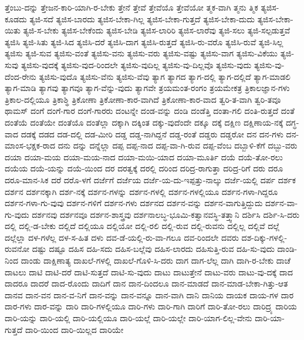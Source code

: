{ತ್ತೆಂಬು-ದನ್ನು
ತ್ತೇಜನ-ಕಾರಿ-ಯಾಗಿ-ರ-ಬೇಕು
ತ್ತೇನೆ
ತ್ತೇವೆ
ತ್ತೇವೆಯೊ
ತ್ತೇವೆಯೋ
ತ್ಮಕ-ವಾಗಿ
ತ್ಮನು
ತ್ಮಿಕ
ತ್ಯಜಿಸ-ಕೂಡದು
ತ್ಯಜಿ-ಸದೆ
ತ್ಯಜಿಸ-ಬಾರದು
ತ್ಯಜಿಸ-ಬೇಕಾ-ಗಿಲ್ಲ
ತ್ಯಜಿಸ-ಬೇಕಾ-ಗುತ್ತದೆ
ತ್ಯಜಿಸ-ಬೇಕಾ-ದುದು
ತ್ಯಜಿಸ-ಬೇಕಾ-ಯಿತು
ತ್ಯಜಿ-ಸ-ಬೇಕು
ತ್ಯಜಿಸ-ಬೇಕೆಂದು
ತ್ಯಜಿಸ-ಬೇಡಿ
ತ್ಯಜಿಸ-ಲಾರಿರಿ
ತ್ಯಜಿಸ-ಲಾರೆವು
ತ್ಯಜಿ-ಸಲು
ತ್ಯಜಿ-ಸಲ್ಪಡುತ್ತವೆ
ತ್ಯಜಿಸಿ
ತ್ಯಜಿ-ಸಿತು
ತ್ಯಜಿ-ಸಿದ
ತ್ಯಜಿಸಿ-ದರೆ
ತ್ಯಜಿಸಿ-ದಾಗ
ತ್ಯಜಿಸಿ-ರುತ್ತದೆ
ತ್ಯಜಿಸಿ-ರು-ವರೊ
ತ್ಯಜಿಸಿ-ರುವೆ
ತ್ಯಜಿ-ಸಿಲ್ಲ
ತ್ಯಜಿಸು
ತ್ಯಜಿ-ಸುವ
ತ್ಯಜಿಸು-ವಂತೆ
ತ್ಯಜಿಸು-ವನು
ತ್ಯಜಿಸು-ವರು
ತ್ಯಜಿಸು-ವಷ್ಟು
ತ್ಯಜಿಸು-ವಾಗ
ತ್ಯಜಿಸು-ವಿಕೆಯು
ತ್ಯಜಿ-ಸುವು
ತ್ಯಜಿಸು-ವುದಕ್ಕೆ
ತ್ಯಜಿಸು-ವುದ-ರಿಂದಲೇ
ತ್ಯಜಿಸು-ವುದಿಲ್ಲ
ತ್ಯಜಿಸು-ವು-ದಿಲ್ಲವೊ
ತ್ಯಜಿಸು-ವುದು
ತ್ಯಜಿಸು-ವು-ದೆಂದ-ರೇನು
ತ್ಯಜಿಸು-ವುದೊ
ತ್ಯಜಿಸು-ವೆನು
ತ್ಯಜಿಸು-ವೆವು
ತ್ಯಾಗ
ತ್ಯಾಗದ
ತ್ಯಾಗ-ದಲ್ಲಿ
ತ್ಯಾಗ-ದಲ್ಲಿದೆ
ತ್ಯಾಗ-ಮಾಡಲಿ
ತ್ಯಾಗ-ಮಾಡಿ
ತ್ಯಾಗವು
ತ್ಯಾಗವೂ
ತ್ಯಾಗ-ವೆನ್ನು-ವುದು
ತ್ಯಾಗವೇ
ತ್ರಯಮಂತ-ರಂಗಂ
ತ್ರಯಮೇಕತ್ರ
ತ್ರಿಕಾಲಜ್ಞಾನ-ಗಳು
ತ್ರಿಕಾಲ-ದಲ್ಲಿಯೂ
ತ್ರಿಕಾಶ್ಥಿ
ತ್ರಿಕೋಣಾ
ತ್ರಿಕೋಣಾ-ಕಾರ-ವಾಗಿದೆ
ತ್ರಿಕೋಣಾ-ಕಾರ-ವಾದ
ತ್ವರಿ-ತ-ವಾಗಿ
ತ್ವರಿ-ತವೂ
ಥಾಮಸ್
ದಂಗೆ
ದಂಗೆ-ಗಾರ
ದಂಗೆ-ಗಾರರು
ದಂಟನ್ನೇ
ದಂಡ-ವನ್ನು
ದಂಡಿ
ದಂಡೆತ್ತಿ
ದಂತಾ-ಗಲಿ
ದಂತಿ-ರುತ್ತದೆ
ದಂತೆ
ದಂತೆಯೆ
ದಂತೆಯೇ
ದಂತೆಯೊ
ದಂತೆಲ್ಲಾ
ದಕ್ಕಾಗಿ
ದಕ್ಕಿಂತ
ದಕ್ಕು-ವುದೆಂದೇ
ದಕ್ಕೂ
ದಕ್ಕೆ
ದಕ್ಷಿಣ
ದಕ್ಷಿಣಾಯ-ನಕ್ಕೆ
ದಗ್ಧ-ವಾದ
ದಡಕ್ಕೆ
ದಡದ
ದಡ-ದಲ್ಲಿ
ದಡ-ಮೀರಿ
ದಡ್ಡ
ದಡ್ಡ-ನಾಗಿದ್ದನೆ
ದಡ್ಡ-ರಂತೆ
ದಡ್ಡರು
ದಡ್ಡರೋ
ದನ
ದನ-ಗಳು
ದನ-ಮಾಂಸ-ಭಕ್ಷಕ-ರಾದ
ದನು
ದನ್ನು
ದನ್ನೆಲ್ಲಾ
ದಪ್ಪ
ದಪ್ಪ-ನಾದ
ದಪ್ಪ-ವಾ-ಗಿ-ರುವ
ದಪ್ಪ-ವೆಂಬ
ದಬ್ಬಾಳಿ-ಕೆಗೆ
ದಬ್ಬು-ವರು
ದಯಾ
ದಯಾ-ಮಯ
ದಯಾ-ಮಯ-ನಾದ
ದಯಾ-ಮಯಿ-ಯಾದ
ದಯಾ-ಮೂರ್ತಿ
ದಯೆ
ದಯೆ-ತೋ-ರಲು
ದಯೆಯ
ದಯೆ-ಯನ್ನು
ದಯೆ-ಯಿಂದ
ದರ
ದರತ್ವಕ್ಕೆ
ದರಲ್ಲಿ
ದರಿಂದ
ದರಿದ್ರ-ರಾಗುತ್ತಾ
ದರಿದ್ರ-ರಿಗೆ
ದರು
ದರೂ
ದರೂ-ಮಾನ-ಸಿಕ
ದರೆ
ದರೊ-ಳಗೆ
ದರ್ಜೆಗೆ
ದರ್ಜೆಯ
ದರ್ಜೆ-ಯ-ದು-ಇಪ್ಪತ್ತು-ನಾಲ್ಕು
ದರ್ಜೆ-ಯಲ್ಲಿ
ದರ್ಪ
ದರ್ಶಕ
ದರ್ಶನ
ದರ್ಶನಕ್ಕಾಗಿ
ದರ್ಶ-ನಕ್ಕೆ
ದರ್ಶನ-ಗಳನ್ನು
ದರ್ಶನ-ಗಳಲ್ಲಿ
ದರ್ಶನ-ಗಳಲ್ಲಿಯೂ
ದರ್ಶನ-ಗಳಾ-ಗಿದ್ದರೂ
ದರ್ಶನ-ಗಳಾ-ಗು-ವುವು
ದರ್ಶನ-ಗಳಿಗೆ
ದರ್ಶನ-ಗಳು
ದರ್ಶನದ
ದರ್ಶನ-ವನ್ನು
ದರ್ಶನ-ವಾಗುತ್ತಿದ್ದುದು
ದರ್ಶನ-ವಾ-ಗು-ವುದು
ದರ್ಶನವು
ದರ್ಶನವೂ
ದರ್ಶನ-ಶಾಸ್ತ್ರವು
ದರ್ಶನಾಲಬ್ಧ-ಭೂಮಿ-ಕತ್ವಾನವಸ್ಥಿ-ತತ್ತ್ವಾನಿ
ದರ್ಶಿಸಿ
ದರ್ಶಿ-ಸಿ-ದರು
ದಲ್ಲಿ
ದಲ್ಲಿ-ಡ-ಬೇಕು
ದಲ್ಲಿದೆ
ದಲ್ಲಿಯೂ
ದಲ್ಲಿಯೋ
ದಲ್ಲಿ-ರಲಿ
ದಲ್ಲಿ-ರುವ
ದಲ್ಲಿ-ರುವನು
ದಲ್ಲಿಲ್ಲ
ದಲ್ಲಿವೆ
ದಲ್ಲೆ
ದಲ್ಲೆಲ್ಲಾ
ದಳ-ಗಳೆಲ್ಲ
ದಳ-ಸ-ಹಿತ
ದಳು
ದವ-ಡೆ-ಯಲ್ಲಿ-ರು-ವಾ-ಗಲೂ
ದವ-ರಿಂದಲೇ
ದವರು
ದಶ-ದಿಕ್ಕು-ಗಳಲ್ಲಿ-ರುವನೋ
ದಷ್ಟು
ದಷ್ಟೂ
ದಹಿಸ
ದಹಿ-ಸದು
ದಹಿಸ-ಬಲ್ಲೆವು
ದಹಿಸ-ಲಾರದು
ದಹಿಸುತ್ತಿ-ರುವ
ದಹಿ-ಸು-ವುದು
ದಾಂಡಿ-ನಿಂದ
ದಾಂಡು
ದಾಕ್ಷಿಣಾತ್ಯ
ದಾಖಲೆ-ಗಳಲ್ಲಿ
ದಾಖಲೆ-ಗೊಳಿ-ಸಿ-ದರು
ದಾಗ
ದಾಗ-ಲೆಲ್ಲ
ದಾಗಿ
ದಾಗಿ-ರ-ಬೇಕು
ದಾಚೆ
ದಾಟಲು
ದಾಟಿ
ದಾಟಿ-ದರೆ
ದಾಟಿ-ಸುತ್ತದೆ
ದಾಟಿ-ಸು-ವುದು
ದಾಟು
ದಾಟುತ್ತೇನೆ
ದಾಟು-ವರು
ದಾಟು-ವು-ದಕ್ಕೆ
ದಾದ
ದಾದರೂ
ದಾದರೆ
ದಾದ-ರೊಂದು
ದಾದಿಗೆ
ದಾನ
ದಾನ-ದಿಂದಲೂ
ದಾನ-ಮಾಡದೆ
ದಾನ-ಮಾಡ-ಬೇಕಾ-ಗಿತ್ತು-ಆತ
ದಾನವ
ದಾನ-ವನ
ದಾನ-ವ-ನಿಗೆ
ದಾನ-ವನ್ನು
ದಾನ-ವನ್ನೂ
ದಾನ-ವಾಗಿ
ದಾನಿ
ದಾನಿಯ
ದಾಯಕ
ದಾಯ-ಗಳ
ದಾರ
ದಾರ-ಗಳು
ದಾರ-ವನ್ನು
ದಾರಿ
ದಾರಿ-ಗಳಲ್ಲಿಯೂ
ದಾರಿ-ಗಳು
ದಾರಿ-ಗಾಗಿ
ದಾರಿಗೆ
ದಾರಿ-ತೋ-ರಲು
ದಾರಿದ್ರ್ಯ
ದಾರಿಯ
ದಾರಿ-ಯನ್ನು
ದಾರಿ-ಯಲ್ಲಿ
ದಾರಿ-ಯಲ್ಲಿಯೂ
ದಾರಿ-ಯಲ್ಲೆ
ದಾರಿ-ಯಲ್ಲೇ
ದಾರಿ-ಯಾಗ-ಲಿಲ್ಲ-ವೇನು
ದಾರಿ-ಯಾ-ಗುತ್ತದೆ
ದಾರಿ-ಯಿಂದ
ದಾರಿ-ಯಿಲ್ಲದ
ದಾರಿಯೇ
}
